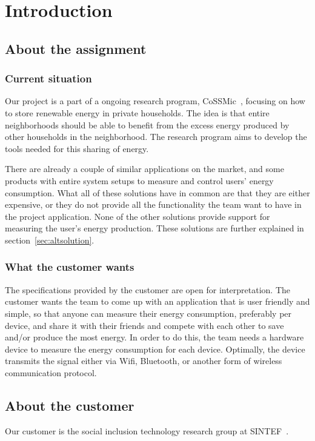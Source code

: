 \chapter{Introduction}

\section{About the assignment}
\subsection{Current situation}
Our project is a part of a ongoing research program, CoSSMic~\cite{cossmic}, focusing on how to store renewable energy in private households. The idea is that entire neighborhoods should be able to benefit from the excess energy produced by other households in the neighborhood. The research program aims to develop the tools needed for this sharing of energy. 

 There are already a couple of similar applications on the market, and some products with entire system setups to measure and control users' energy consumption. What all of these solutions have in common are that they are either expensive, or they do not provide all the functionality the team want to have in the project application. None of the other solutions provide support for measuring the user's energy production. These solutions are further explained in section~\ref{sec:altsolution}.

\subsection{What the customer wants}
The specifications provided by the customer are open for interpretation. The customer wants the team to come up with an application that is user friendly and simple, so that anyone can measure their energy consumption, preferably per device, and share it with their friends and compete with each other to save and/or produce the most energy. In order to do this, the team needs a hardware device to measure the energy consumption for each device. Optimally, the device transmits the signal either via Wifi, Bluetooth, or another form of wireless communication protocol. 

\section{About the customer}

Our customer is the social inclusion technology research group at SINTEF~\cite{sintef}.








 


